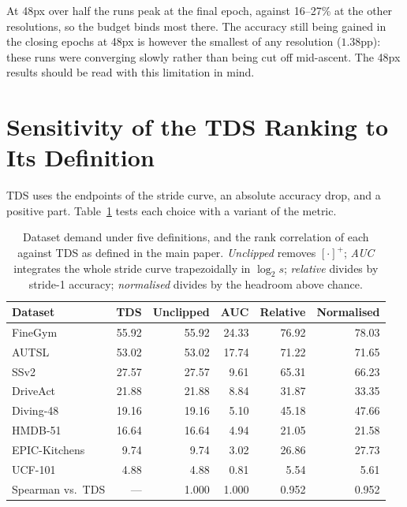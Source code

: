 \documentclass[a4paper, 10pt, conference, onecolumn]{ieeeconf}
\newcommand{\tabtight}{\setlength{\tabcolsep}{3.5pt}\renewcommand{\arraystretch}{1.12}}
\newcommand{\TDS}{\textsc{TDS}}
\begin{document}
At 48px over half the runs peak at the final epoch, against 16--27\% at the
other resolutions, so the budget binds most there. The accuracy still being
gained in the closing epochs at 48px is however the smallest of any resolution
($1.38$pp): these runs were converging slowly rather than being cut off
mid-ascent. The 48px results should be read with this limitation in mind.

\section{Sensitivity of the \texorpdfstring{\TDS{}}{TDS} Ranking to Its Definition}
\label{sec:sup_tds_variants}

\TDS{} uses the endpoints of the stride curve, an absolute accuracy drop, and a
positive part. Table~\ref{tab:sup_tds_variants} tests each choice with a variant
of the metric.

\begin{table}[!htbp]
\centering
\caption{Dataset demand under five definitions, and the rank correlation of each
against \TDS{} as defined in the main paper. \emph{Unclipped} removes
$[\cdot]^+$; \emph{AUC} integrates the whole stride curve trapezoidally in
$\log_2 s$; \emph{relative} divides by stride-1 accuracy; \emph{normalised}
divides by the headroom above chance.}
\label{tab:sup_tds_variants}
\scriptsize\tabtight
\begin{tabular}{l rrrrr}
\toprule
Dataset & \TDS{} & Unclipped & AUC & Relative & Normalised \\
\midrule
FineGym       & 55.92 & 55.92 & 24.33 & 76.92 & 78.03 \\
AUTSL         & 53.02 & 53.02 & 17.74 & 71.22 & 71.65 \\
SSv2          & 27.57 & 27.57 &  9.61 & 65.31 & 66.23 \\
DriveAct      & 21.88 & 21.88 &  8.84 & 31.87 & 33.35 \\
Diving-48     & 19.16 & 19.16 &  5.10 & 45.18 & 47.66 \\
HMDB-51       & 16.64 & 16.64 &  4.94 & 21.05 & 21.58 \\
EPIC-Kitchens &  9.74 &  9.74 &  3.02 & 26.86 & 27.73 \\
UCF-101       &  4.88 &  4.88 &  0.81 &  5.54 &  5.61 \\
\midrule
Spearman vs.\ \TDS{} & --- & 1.000 & 1.000 & 0.952 & 0.952 \\
\bottomrule
\end{tabular}
\end{table}
\end{document}
